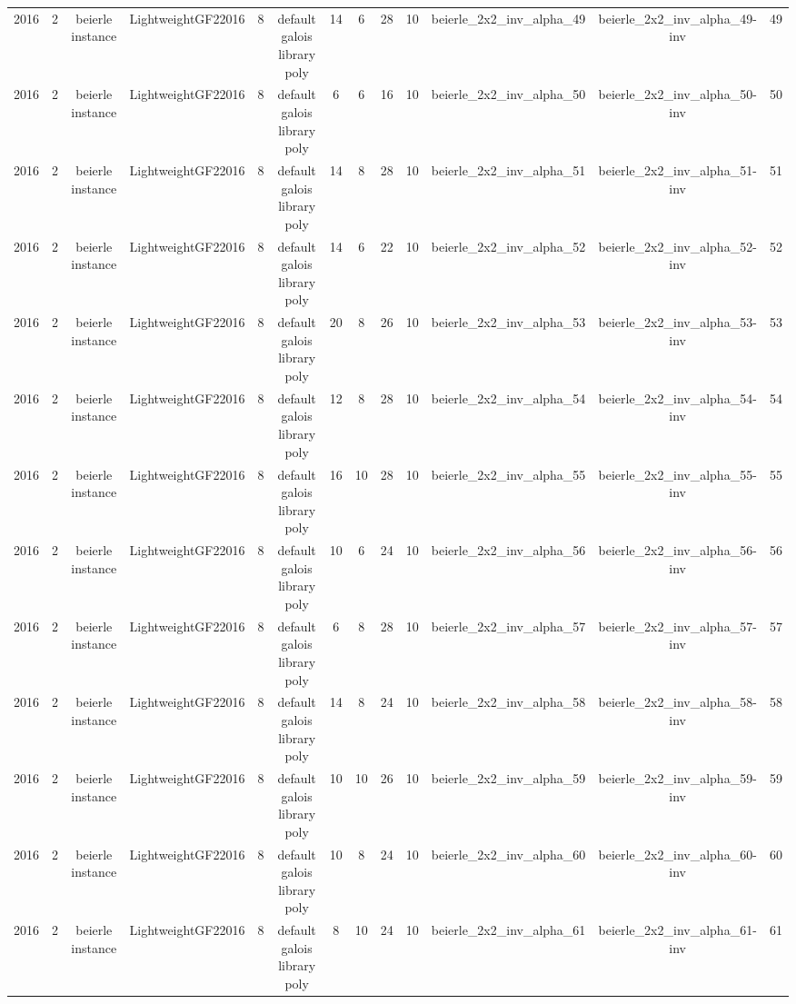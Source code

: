 \begin{tabular}{c c c c c c c c c c c c c}
2016 & 2 & beierle instance & LightweightGF22016 & 8 & default galois library poly & 14 & 6 & 28 & 10 & beierle_2x2_inv_alpha_49 & beierle_2x2_inv_alpha_49-inv & 49 \\
2016 & 2 & beierle instance & LightweightGF22016 & 8 & default galois library poly & 6 & 6 & 16 & 10 & beierle_2x2_inv_alpha_50 & beierle_2x2_inv_alpha_50-inv & 50 \\
2016 & 2 & beierle instance & LightweightGF22016 & 8 & default galois library poly & 14 & 8 & 28 & 10 & beierle_2x2_inv_alpha_51 & beierle_2x2_inv_alpha_51-inv & 51 \\
2016 & 2 & beierle instance & LightweightGF22016 & 8 & default galois library poly & 14 & 6 & 22 & 10 & beierle_2x2_inv_alpha_52 & beierle_2x2_inv_alpha_52-inv & 52 \\
2016 & 2 & beierle instance & LightweightGF22016 & 8 & default galois library poly & 20 & 8 & 26 & 10 & beierle_2x2_inv_alpha_53 & beierle_2x2_inv_alpha_53-inv & 53 \\
2016 & 2 & beierle instance & LightweightGF22016 & 8 & default galois library poly & 12 & 8 & 28 & 10 & beierle_2x2_inv_alpha_54 & beierle_2x2_inv_alpha_54-inv & 54 \\
2016 & 2 & beierle instance & LightweightGF22016 & 8 & default galois library poly & 16 & 10 & 28 & 10 & beierle_2x2_inv_alpha_55 & beierle_2x2_inv_alpha_55-inv & 55 \\
2016 & 2 & beierle instance & LightweightGF22016 & 8 & default galois library poly & 10 & 6 & 24 & 10 & beierle_2x2_inv_alpha_56 & beierle_2x2_inv_alpha_56-inv & 56 \\
2016 & 2 & beierle instance & LightweightGF22016 & 8 & default galois library poly & 6 & 8 & 28 & 10 & beierle_2x2_inv_alpha_57 & beierle_2x2_inv_alpha_57-inv & 57 \\
2016 & 2 & beierle instance & LightweightGF22016 & 8 & default galois library poly & 14 & 8 & 24 & 10 & beierle_2x2_inv_alpha_58 & beierle_2x2_inv_alpha_58-inv & 58 \\
2016 & 2 & beierle instance & LightweightGF22016 & 8 & default galois library poly & 10 & 10 & 26 & 10 & beierle_2x2_inv_alpha_59 & beierle_2x2_inv_alpha_59-inv & 59 \\
2016 & 2 & beierle instance & LightweightGF22016 & 8 & default galois library poly & 10 & 8 & 24 & 10 & beierle_2x2_inv_alpha_60 & beierle_2x2_inv_alpha_60-inv & 60 \\
2016 & 2 & beierle instance & LightweightGF22016 & 8 & default galois library poly & 8 & 10 & 24 & 10 & beierle_2x2_inv_alpha_61 & beierle_2x2_inv_alpha_61-inv & 61 \\

\end{tabular}
